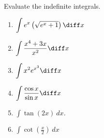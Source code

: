 Evaluate the indefinite integrals.
\begin{multicols}{2}
\begin{enumerate}
\item ${\displaystyle \int e^x \left(\sqrt{e^x + 1}\right) \diff x}$


\item ${\displaystyle \int \frac{x^4 + 3x}{x^2} \diff x}$


\item ${\displaystyle \int x^2 e^{x^3} \diff x}$

\item ${\displaystyle \int \frac{\cos x}{\sin x} \diff x}$

\item $\displaystyle\int \tan (2x) ~dx$.


\item $\displaystyle \int \cot \left(\frac{x}{2}\right)~dx$


\end{enumerate}
\end{multicols}
